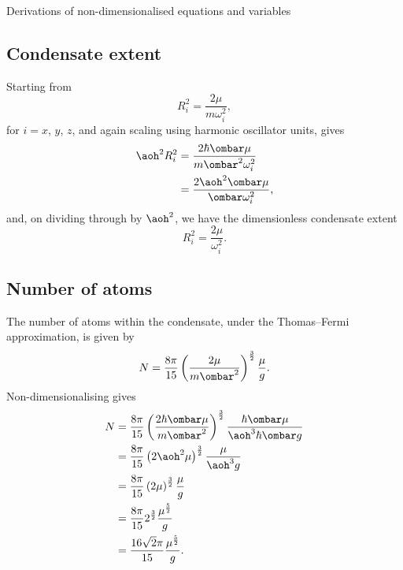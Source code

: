 \begin{chapter}{\label{cha:nondim}Derivations of non-dimensionalised equations
and variables}
  \subsection{Condensate extent}
  Starting from
  \begin{equation*}
    R_{i}^{2} = \frac{2\mu}{m \omega_{i}^{2}},
  \end{equation*}
  for $i=x$, $y$, $z$, and again scaling using harmonic oscillator units,
  gives
  \begin{equation*}
    \begin{aligned}
      \aoh^{2} R_{i}^{2} &= \frac{2 \hbar \ombar \mu}{m \ombar^{2}
      \omega_{i}^{2}} \\
      &= \frac{2\aoh^{2} \ombar \mu}{\ombar \omega_{i}^{2}},
    \end{aligned}
  \end{equation*}
  and, on dividing through by $\aoh^{2}$, we have the dimensionless condensate
  extent
  \begin{equation*}
    R_{i}^{2} = \frac{2\mu}{\omega_{i}^{2}}.
  \end{equation*}

  \subsection{Number of atoms}
  The number of atoms within the condensate, under the Thomas--Fermi
  approximation, is given by
  \begin{equation*}
    N = \frac{8\pi}{15} \left( \frac{2\mu}{m\ombar^2} \right)^{\frac{3}{2}}
    \frac{\mu}{g}.
  \end{equation*}
  Non-dimensionalising gives
  \begin{equation*}
    \begin{aligned}
      N &= \frac{8\pi}{15} \left( \frac{2\hbar \ombar \mu}{m\ombar^2}
      \right)^{\frac{3}{2}} \frac{\hbar \ombar \mu}{\aoh^{3} \hbar \ombar g} \\
      &= \frac{8\pi}{15} \left( 2\aoh^{2} \mu \right)^{\frac{3}{2}}
      \frac{\mu}{\aoh^{3} g} \\
      &= \frac{8\pi}{15} \left( 2\mu \right)^{\frac{3}{2}} \frac{\mu}{g} \\
      &= \frac{8\pi}{15} 2^{\frac{3}{2}} \frac{\mu^{\frac{5}{2}}}{g} \\
      &= \frac{16\sqrt{2}\pi}{15} \frac{\mu^{\frac{5}{2}}}{g}.
  \end{aligned}
  \end{equation*}


\end{chapter}
